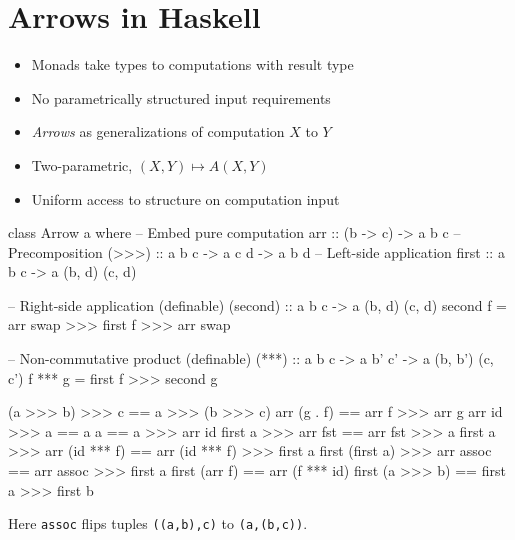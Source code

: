 \section{Arrows in Haskell}

\frame{\tableofcontents[currentsection]}

\begin{frame}
    \begin{itemize}
        \item Monads take types to computations with result type
        \item No parametrically structured input requirements
        \item \emph{Arrows} as generalizations of computation $X$ to $Y$
        \item Two-parametric, $(X, Y) \mapsto A(X, Y)$
        \item Uniform access to structure on computation input
    \end{itemize}
\end{frame}

\begin{frame}[fragile]
    \begin{definition}
        \begin{code}
class Arrow a where
  -- Embed pure computation
  arr   :: (b -> c) -> a b c
  -- Precomposition
  (>>>) :: a b c -> a c d -> a b d
  -- Left-side application
  first :: a b c -> a (b, d) (c, d)

  -- Right-side application (definable)
  (second) :: a b c -> a (b, d) (c, d)
  second f = arr swap >>> first f >>> arr swap

  -- Non-commutative product (definable)
  (***) :: a b c -> a b' c' -> a (b, b') (c, c')
  f *** g = first f >>> second g
        \end{code}
    \end{definition}
\end{frame}

\begin{frame}[fragile]
\begin{definition}
\begin{code}[numbers=left]
              (a >>> b) >>> c == a >>> (b >>> c)
                  arr (g . f) == arr f >>> arr g
                  arr id >>> a == a
                             a == a >>> arr id
           first a >>> arr fst == arr fst >>> a
    first a >>> arr (id *** f) == arr (id *** f) >>> first a
 first (first a) >>> arr assoc == arr assoc >>> first a
                 first (arr f) == arr (f *** id)
               first (a >>> b) == first a >>> first b
\end{code}
Here \verb|assoc| flips tuples \verb|((a,b),c)| to \verb|(a,(b,c))|.
\end{definition}
\end{frame}

